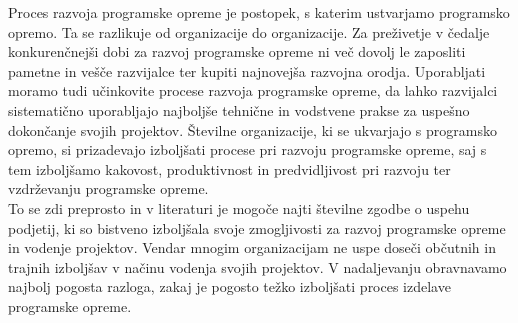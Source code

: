 \documentclass[a4paper,12pt,openright]{book}
\begin{document}
Proces razvoja programske opreme je postopek, s katerim ustvarjamo programsko opremo. Ta se razlikuje od organizacije do organizacije. Za preživetje v čedalje konkurenčnejši dobi za razvoj programske opreme ni več dovolj le zaposliti pametne in vešče razvijalce ter kupiti najnovejša razvojna orodja. Uporabljati moramo tudi učinkovite procese razvoja programske opreme, da lahko razvijalci sistematično uporabljajo najboljše tehnične in vodstvene prakse za uspešno dokončanje svojih projektov. Številne organizacije, ki se ukvarjajo s programsko opremo, si prizadevajo izboljšati procese pri razvoju programske opreme, saj s tem izboljšamo kakovost, produktivnost in predvidljivost pri razvoju ter vzdrževanju programske opreme. \\
To se zdi preprosto in v literaturi je mogoče najti številne zgodbe o uspehu podjetij, ki so bistveno izboljšala svoje zmogljivosti za razvoj programske opreme in vodenje projektov. Vendar mnogim organizacijam ne uspe doseči občutnih in trajnih izboljšav v načinu vodenja svojih projektov. V nadaljevanju obravnavamo najbolj pogosta razloga, zakaj je pogosto težko izboljšati proces izdelave programske opreme.
\cite{aggarwal2005software, humphrey1989managing}
\end{document}
